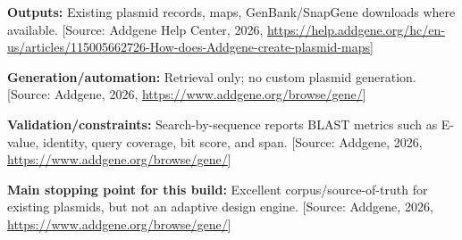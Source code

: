 \documentclass[11pt]{report}
\begin{document}
\begin{description}
\textbf{Outputs:} Existing plasmid records, maps, GenBank/SnapGene downloads where available. [Source: Addgene Help Center, 2026, \url{https://help.addgene.org/hc/en-us/articles/115005662726-How-does-Addgene-create-plasmid-maps}]\par
\textbf{Generation/automation:} Retrieval only; no custom plasmid generation. [Source: Addgene, 2026, \url{https://www.addgene.org/browse/gene/}]\par
\textbf{Validation/constraints:} Search-by-sequence reports BLAST metrics such as E-value, identity, query coverage, bit score, and span. [Source: Addgene, 2026, \url{https://www.addgene.org/browse/gene/}]\par
\textbf{Main stopping point for this build:} Excellent corpus/source-of-truth for existing plasmids, but not an adaptive design engine. [Source: Addgene, 2026, \url{https://www.addgene.org/browse/gene/}]\par
\end{description}
\end{document}
